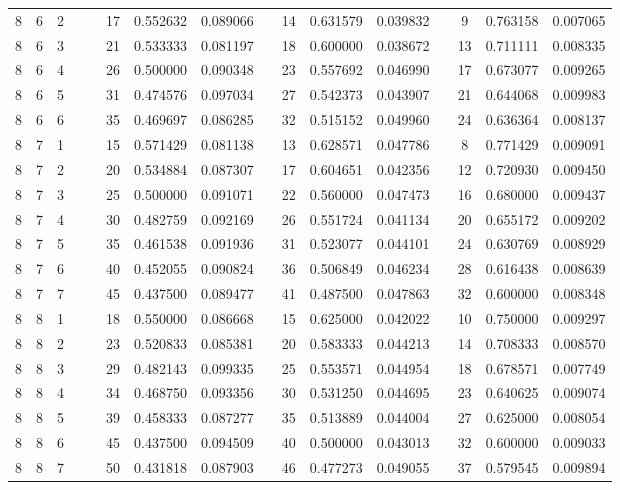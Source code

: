 \begin{appendix}
\begin{longtable}[h]{rrrccccccccccccc}
8	&	6	&	2	&&&	17	&	0.552632	&	0.089066	&&	14	&	0.631579	&	0.039832	&&	9	&	0.763158	&	0.007065	\\
8	&	6	&	3	&&&	21	&	0.533333	&	0.081197	&&	18	&	0.600000	&	0.038672	&&	13	&	0.711111	&	0.008335	\\
8	&	6	&	4	&&&	26	&	0.500000	&	0.090348	&&	23	&	0.557692	&	0.046990	&&	17	&	0.673077	&	0.009265	\\
8	&	6	&	5	&&&	31	&	0.474576	&	0.097034	&&	27	&	0.542373	&	0.043907	&&	21	&	0.644068	&	0.009983	\\
8	&	6	&	6	&&&	35	&	0.469697	&	0.086285	&&	32	&	0.515152	&	0.049960	&&	24	&	0.636364	&	0.008137	\\
8	&	7	&	1	&&&	15	&	0.571429	&	0.081138	&&	13	&	0.628571	&	0.047786	&&	8	&	0.771429	&	0.009091	\\
8	&	7	&	2	&&&	20	&	0.534884	&	0.087307	&&	17	&	0.604651	&	0.042356	&&	12	&	0.720930	&	0.009450	\\
8	&	7	&	3	&&&	25	&	0.500000	&	0.091071	&&	22	&	0.560000	&	0.047473	&&	16	&	0.680000	&	0.009437	\\
8	&	7	&	4	&&&	30	&	0.482759	&	0.092169	&&	26	&	0.551724	&	0.041134	&&	20	&	0.655172	&	0.009202	\\
8	&	7	&	5	&&&	35	&	0.461538	&	0.091936	&&	31	&	0.523077	&	0.044101	&&	24	&	0.630769	&	0.008929	\\
8	&	7	&	6	&&&	40	&	0.452055	&	0.090824	&&	36	&	0.506849	&	0.046234	&&	28	&	0.616438	&	0.008639	\\
8	&	7	&	7	&&&	45	&	0.437500	&	0.089477	&&	41	&	0.487500	&	0.047863	&&	32	&	0.600000	&	0.008348	\\
8	&	8	&	1	&&&	18	&	0.550000	&	0.086668	&&	15	&	0.625000	&	0.042022	&&	10	&	0.750000	&	0.009297	\\
8	&	8	&	2	&&&	23	&	0.520833	&	0.085381	&&	20	&	0.583333	&	0.044213	&&	14	&	0.708333	&	0.008570	\\
8	&	8	&	3	&&&	29	&	0.482143	&	0.099335	&&	25	&	0.553571	&	0.044954	&&	18	&	0.678571	&	0.007749	\\
8	&	8	&	4	&&&	34	&	0.468750	&	0.093356	&&	30	&	0.531250	&	0.044695	&&	23	&	0.640625	&	0.009074	\\
8	&	8	&	5	&&&	39	&	0.458333	&	0.087277	&&	35	&	0.513889	&	0.044004	&&	27	&	0.625000	&	0.008054	\\
8	&	8	&	6	&&&	45	&	0.437500	&	0.094509	&&	40	&	0.500000	&	0.043013	&&	32	&	0.600000	&	0.009033	\\
8	&	8	&	7	&&&	50	&	0.431818	&	0.087903	&&	46	&	0.477273	&	0.049055	&&	37	&	0.579545	&	0.009894	\\

\end{longtable}
\end{appendix}
